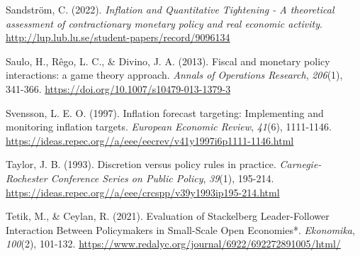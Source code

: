 \documentclass[
  man,
  longtable,
  nolmodern,
  notxfonts,
  notimes,
  colorlinks=true,linkcolor=blue,citecolor=blue,urlcolor=blue]{apa7}
\newlength{\cslhangindent}
\newenvironment{CSLReferences}[2] %
 {\begin{list}{}{%
  \setlength{\itemindent}{0pt}
  \setlength{\leftmargin}{0pt}
  \setlength{\parsep}{0pt}
  \ifodd #1
   \setlength{\leftmargin}{\cslhangindent}
   \setlength{\itemindent}{-1\cslhangindent}
  \fi
  \setlength{\itemsep}{#2\baselineskip}}}
 {\end{list}}
\begin{document}
\begin{CSLReferences}{1}{0}
Sandström, C. (2022). \emph{Inflation and Quantitative Tightening - A
theoretical assessment of contractionary monetary policy and real
economic activity}.
\url{http://lup.lub.lu.se/student-papers/record/9096134}

Saulo, H., Rêgo, L. C., \& Divino, J. A. (2013). Fiscal and monetary
policy interactions: a game theory approach. \emph{Annals of Operations
Research}, \emph{206}(1), 341-366.
\url{https://doi.org/10.1007/s10479-013-1379-3}

Svensson, L. E. O. (1997). Inflation forecast targeting: Implementing
and monitoring inflation targets. \emph{European Economic Review},
\emph{41}(6), 1111-1146.
\url{https://ideas.repec.org//a/eee/eecrev/v41y1997i6p1111-1146.html}

Taylor, J. B. (1993). Discretion versus policy rules in practice.
\emph{Carnegie-Rochester Conference Series on Public Policy},
\emph{39}(1), 195-214.
\url{https://ideas.repec.org//a/eee/crcspp/v39y1993ip195-214.html}

Tetik, M., \& Ceylan, R. (2021). Evaluation of Stackelberg
Leader-Follower Interaction Between Policymakers in Small-Scale Open
Economies*. \emph{Ekonomika}, \emph{100}(2), 101-132.
\url{https://www.redalyc.org/journal/6922/692272891005/html/}

\end{CSLReferences}
\end{document}

